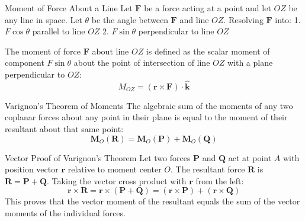 \documentclass[11pt,a4paper]{article}
\begin{document}
\begin{center}
\end{center}

\begin{definitionbox}{Moment of Force About a Line}
Let $\mathbf{F}$ be a force acting at a point and let $OZ$ be any line in space. Let $\theta$ be the angle between $\mathbf{F}$ and line $OZ$.
Resolving $\mathbf{F}$ into:
1. $F \cos\theta$ parallel to line $OZ$
2. $F \sin\theta$ perpendicular to line $OZ$

The moment of force $\mathbf{F}$ about line $OZ$ is defined as the scalar moment of component $F \sin\theta$ about the point of intersection of line $OZ$ with a plane perpendicular to $OZ$:
\begin{equation}
M_{OZ} = (\mathbf{r} \times \mathbf{F}) \cdot \hat{\mathbf{k}}
\end{equation}
\end{definitionbox}

\begin{theorembox}{Varignon's Theorem of Moments}
The algebraic sum of the moments of any two coplanar forces about any point in their plane is equal to the moment of their resultant about that same point:
\begin{equation}
\mathbf{M}_O(\mathbf{R}) = \mathbf{M}_O(\mathbf{P}) + \mathbf{M}_O(\mathbf{Q})
\end{equation}
\end{theorembox}

\begin{proofbox}{Vector Proof of Varignon's Theorem}
Let two forces $\mathbf{P}$ and $\mathbf{Q}$ act at point $A$ with position vector $\mathbf{r}$ relative to moment center $O$.
The resultant force $\mathbf{R}$ is $\mathbf{R} = \mathbf{P} + \mathbf{Q}$.
Taking the vector cross product with $\mathbf{r}$ from the left:
\[
\mathbf{r} \times \mathbf{R} = \mathbf{r} \times (\mathbf{P} + \mathbf{Q}) = (\mathbf{r} \times \mathbf{P}) + (\mathbf{r} \times \mathbf{Q})
\]
This proves that the vector moment of the resultant equals the sum of the vector moments of the individual forces.
\end{proofbox}
\end{document}
